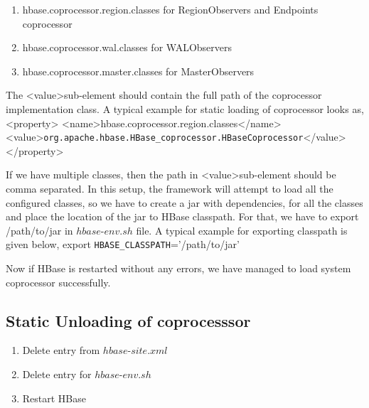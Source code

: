 \documentclass[11pt,a4paper,bibtotoc,idxtotoc,headsepline,footsepline,footexclude,BCOR12mm,DIV13]{scrbook}
\begin{document}
\begin{enumerate}
    \item hbase.coprocessor.region.classes for RegionObservers and Endpoints coprocessor
    \item hbase.coprocessor.wal.classes for WALObservers
    \item hbase.coprocessor.master.classes for MasterObservers
    
\end{enumerate}

The \textless value\textgreater \space sub-element should contain the full path of the coprocessor implementation class. A typical example for static loading of coprocessor looks as,\newline \newline \textless property\textgreater \newline
\textless name\textgreater hbase.coprocessor.region.classes\textless /name\textgreater \newline
\textless value\textgreater \texttt{org.apache.hbase.HBase\_coprocessor.HBaseCoprocessor}\textless /value\textgreater \newline
\textless /property\textgreater \newline

 If we have multiple classes, then the path in \textless value\textgreater \space sub-element should be comma separated. In this setup, the framework will attempt to load all the configured classes, so we have to create a jar with dependencies, for all the classes and place the location of the jar to HBase classpath. For that, we have to export /path/to/jar in $hbase$-$env.sh$ file. A typical example for exporting classpath is given below, \newline \newline
 export \texttt{HBASE\_CLASSPATH}='/path/to/jar' \newline
 
Now if HBase is restarted without any errors, we have managed to load system coprocessor successfully. 

\subsection{Static Unloading of coprocesssor}
\begin{enumerate}
    \item Delete entry from $hbase$-$site.xml$
    \item Delete entry for $hbase$-$env.sh$
    \item Restart HBase
\end{enumerate}
\end{document}
